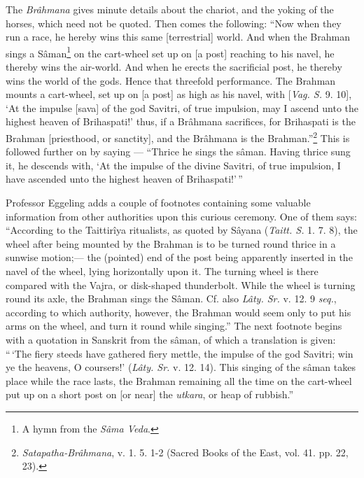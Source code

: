 \documentclass[a4paper, 11pt, oneside, polutonikogreek, english]{article}
\begin{document}
The \emph{Brâhmana} gives minute details about the chariot, and the yoking of the horses, which need not be quoted. Then comes the following: ``Now when they run a race, he hereby wins this same [terrestrial] world. And when the Brahman sings a Sâman\footnote{A hymn from the \emph{Sâma Veda}.} on the cart-wheel set up on [a post] reaching to his navel, he thereby wins the air-world. And when he erects the sacrificial post, he thereby wins the world of the gods. Hence that threefold performance. The Brahman mounts a cart-wheel, set up on [a post] as high as his navel, with [\emph{Vag. S.} 9. 10], `At the impulse [sava] of the god Savitri, of true impulsion, may I ascend unto the highest heaven of Brihaspati!' thus, if a Brâhmana sacrifices, for Brihaspati is the Brahman [priesthood, or sanctity], and the Brâhmana is the Brahman.''\footnote{\emph{Satapatha-Brâhmana}, v. 1. 5. 1-2 (Sacred Books of the East, vol. 41. pp. 22, 23).} This is followed further on by saying --- ``Thrice he sings the sâman. Having thrice sung it, he descends with, `At the impulse of the divine Savitri, of true impulsion, I have ascended unto the highest heaven of Brihaspati!'\,''

Professor Eggeling adds a couple of footnotes containing some valuable information from other authorities upon this curious ceremony. One of them says: ``According to the Taittirîya ritualists, as quoted by Sâyana (\emph{Taitt. S.} 1. 7. 8), the wheel after being mounted by the Brahman is to be turned round thrice in a sunwise motion;--- the (pointed) end of the post being apparently inserted in the navel of the wheel, lying horizontally upon it. The turning wheel is there compared with the Vajra, or disk-shaped thunderbolt. While the wheel is turning round its axle, the Brahman sings the Sâman. Cf. also \emph{Lâty. Sr.} v. 12. 9 \emph{seq.}, according to which authority, however, the Brahman would seem only to put his arms on the wheel, and turn it round while singing.'' The next footnote begins with a quotation in Sanskrit from the sâman, of which a translation is given: ``\,`The fiery steeds have gathered fiery mettle, the impulse of the god Savitri; win ye the heavens, O coursers!' (\emph{Lâty. Sr.} v. 12. 14). This singing of the sâman takes place while the race lasts, the Brahman remaining all the time on the cart-wheel put up on a short post on [or near] the \emph{utkara}, or heap of rubbish.''
\end{document}
